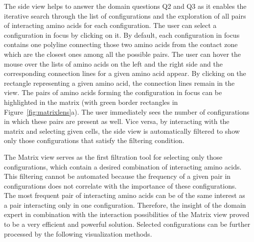 \documentclass{bmcart}
\def\MatView {Matrix view\xspace}
\begin{document}
The side view helps to answer the domain questions Q2 and Q3 as it enables the iterative search through the list of configurations and the exploration of all pairs of interacting amino acids for each configuration.
The user can select a configuration in focus by clicking on it. 
By default, each configuration in focus contains one polyline connecting those two amino acids from the contact zone which are the closest ones among all the possible pairs.
The user can hover the mouse over the lists of amino acids on the left and the right side and the corresponding connection lines for a given amino acid appear.
By clicking on the rectangle representing a given amino acid, the connection lines remain in the view. 
The pairs of amino acids forming the configuration in focus can be highlighted in the matrix (with green border rectangles in Figure~\ref{fig:matrixlens}a).
The user immediately sees the number of configurations in which these pairs are present as well.
Vice versa, by interacting with the matrix and selecting given cells, the side view is automatically filtered to show only those configurations that satisfy the filtering condition.

The \MatView serves as the first filtration tool for selecting only those configurations, which contain a desired combination of interacting amino acids.
This filtering cannot be automated because the frequency of a given pair in configurations does not correlate with the importance of these configurations.
The most frequent pair of interacting amino acids can be of the same interest as a pair interacting only in one configuration.
Therefore, the insight of the domain expert in combination with the interaction possibilities of the \MatView proved to be a very efficient and powerful solution.
Selected configurations can be further processed by the following visualization methods.


\end{document}
